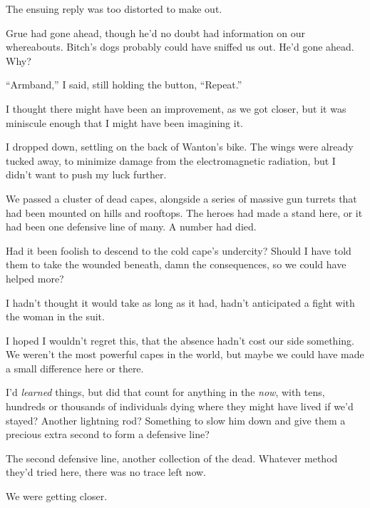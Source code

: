 The ensuing reply was too distorted to make out.



Grue had gone ahead, though he'd no doubt had information on our whereabouts.  Bitch's dogs probably could have sniffed us out.  He'd gone ahead.  Why?



``Armband,'' I said, still holding the button, ``Repeat.''



I thought there might have been an improvement, as we got closer, but it was miniscule enough that I might have been imagining it.



I dropped down, settling on the back of Wanton's bike.  The wings were already tucked away, to minimize damage from the electromagnetic radiation, but I didn't want to push my luck further.



We passed a cluster of dead capes, alongside a series of massive gun turrets that had been mounted on hills and rooftops.  The heroes had made a stand here, or it had been one defensive line of many.  A number had died.



Had it been foolish to descend to the cold cape's undercity?  Should I have told them to take the wounded beneath, damn the consequences, so we could have helped more?



I hadn't thought it would take as long as it had, hadn't anticipated a fight with the woman in the suit.



I hoped I wouldn't regret this, that the absence hadn't cost our side something.  We weren't the most powerful capes in the world, but maybe we could have made a small difference here or there.



I'd \emph{learned} things, but did that count for anything in the \emph{now}, with tens, hundreds or thousands of individuals dying where they might have lived if we'd stayed?  Another lightning rod?  Something to slow him down and give them a precious extra second to form a defensive line?



The second defensive line, another collection of the dead.  Whatever method they'd tried here, there was no trace left now.



We were getting closer.



